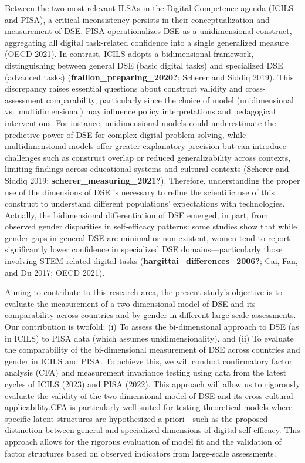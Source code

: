 \documentclass[
  letterpaper,
  DIV=11,
  numbers=noendperiod]{scrartcl}
\begin{document}
Between the two most relevant ILSAs in the Digital Competence agenda
(ICILS and PISA), a critical inconsistency persists in their
conceptualization and measurement of DSE. PISA operationalizes DSE as a
unidimensional construct, aggregating all digital task-related
confidence into a single generalized measure (OECD 2021). In contrast,
ICILS adopts a bidimensional framework, distinguishing between general
DSE (basic digital tasks) and specialized DSE (advanced tasks)
(\textbf{fraillon\_preparing\_2020?}; Scherer and Siddiq 2019). This
discrepancy raises essential questions about construct validity and
cross-assessment comparability, particularly since the choice of model
(unidimensional vs.~multidimensional) may influence policy
interpretations and pedagogical interventions. For instance,
unidimensional models could underestimate the predictive power of DSE
for complex digital problem-solving, while multidimensional models offer
greater explanatory precision but can introduce challenges such as
construct overlap or reduced generalizability across contexts, limiting
findings across educational systems and cultural contexts (Scherer and
Siddiq 2019; \textbf{scherer\_measuring\_2021?}). Therefore,
understanding the proper use of the dimensions of DSE is necessary to
refine the scientific use of this construct to understand different
populations' expectations with technologies. Actually, the bidimensional
differentiation of DSE emerged, in part, from observed gender
disparities in self-efficacy patterns: some studies show that while
gender gaps in general DSE are minimal or non-existent, women tend to
report significantly lower confidence in specialized DSE
domains---particularly those involving STEM-related digital tasks
(\textbf{hargittai\_differences\_2006?}; Cai, Fan, and Du 2017; OECD
2021).

Aiming to contribute to this research area, the present study's
objective is to evaluate the measurement of a two-dimensional model of
DSE and its comparability across countries and by gender in different
large-scale assessments. Our contribution is twofold: (i) To assess the
bi-dimensional approach to DSE (as in ICILS) to PISA data (which assumes
unidimensionality), and (ii) To evaluate the comparability of the
bi-dimensional measurement of DSE across countries and gender in ICILS
and PISA. To achieve this, we will conduct confirmatory factor analysis
(CFA) and measurement invariance testing using data from the latest
cycles of ICILS (2023) and PISA (2022). This approach will allow us to
rigorously evaluate the validity of the two-dimensional model of DSE and
its cross-cultural applicability.CFA is particularly well-suited for
testing theoretical models where specific latent structures are
hypothesized a priori---such as the proposed distinction between general
and specialized dimensions of digital self-efficacy. This approach
allows for the rigorous evaluation of model fit and the validation of
factor structures based on observed indicators from large-scale
assessments.
\end{document}
